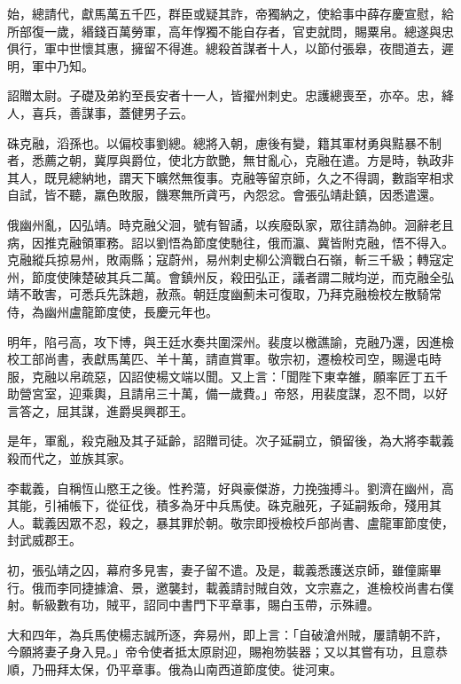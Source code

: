 \begin{pinyinscope}
 始，總請代，獻馬萬五千匹，群臣或疑其詐，帝獨納之，使給事中薛存慶宣慰，給所部復一歲，緡錢百萬勞軍，高年惸獨不能自存者，官吏就問，賜粟帛。總遂與忠俱行，軍中世懷其惠，擁留不得進。總殺首謀者十人，以節付張皋，夜間道去，遲明，軍中乃知。



 詔贈太尉。子礎及弟約至長安者十一人，皆擢州刺史。忠護總喪至，亦卒。忠，絳人，喜兵，善謀事，蓋健男子云。



 硃克融，滔孫也。以偏校事劉總。總將入朝，慮後有變，籍其軍材勇與黠暴不制者，悉薦之朝，冀厚與爵位，使北方歆艷，無甘亂心，克融在遣。方是時，執政非其人，既見總納地，謂天下曠然無復事。克融等留京師，久之不得調，數詣宰相求自試，皆不聽，羸色敗服，饑寒無所貣丐，內怨忿。會張弘靖赴鎮，因悉遣還。



 俄幽州亂，囚弘靖。時克融父洄，號有智譎，以疾廢臥家，眾往請為帥。洄辭老且病，因推克融領軍務。詔以劉悟為節度使馳往，俄而瀛、冀皆附克融，悟不得入。克融縱兵掠易州，敗兩縣；寇蔚州，易州刺史柳公濟戰白石嶺，斬三千級；轉寇定州，節度使陳楚破其兵二萬。會鎮州反，殺田弘正，議者謂二賊均逆，而克融全弘靖不敢害，可悉兵先誅趙，赦燕。朝廷度幽薊未可復取，乃拜克融檢校左散騎常侍，為幽州盧龍節度使，長慶元年也。



 明年，陷弓高，攻下博，與王廷水奏共圍深州。裴度以檄譙諭，克融乃還，因進檢校工部尚書，表獻馬萬匹、羊十萬，請直賞軍。敬宗初，遷檢校司空，賜邊屯時服，克融以帛疏惡，囚詔使楊文端以聞。又上言：「聞陛下東幸雒，願率匠丁五千助營宮室，迎乘輿，且請帛三十萬，備一歲費。」帝怒，用裴度謀，忍不問，以好言答之，屈其謀，進爵吳興郡王。



 是年，軍亂，殺克融及其子延齡，詔贈司徒。次子延嗣立，領留後，為大將李載義殺而代之，並族其家。



 李載義，自稱恆山愍王之後。性矜蕩，好與豪傑游，力挽強搏斗。劉濟在幽州，高其能，引補帳下，從征伐，積多為牙中兵馬使。硃克融死，子延嗣叛命，殘用其人。載義因眾不忍，殺之，暴其罪於朝。敬宗即授檢校戶部尚書、盧龍軍節度使，封武威郡王。



 初，張弘靖之囚，幕府多見害，妻子留不遣。及是，載義悉護送京師，雖僮廝畢行。俄而李同捷據滄、景，邀襲封，載義請討賊自效，文宗嘉之，進檢校尚書右僕射。斬級數有功，賊平，詔同中書門下平章事，賜白玉帶，示殊禮。



 大和四年，為兵馬使楊志誠所逐，奔易州，即上言：「自破滄州賊，屢請朝不許，今願將妻子身入見。」帝令使者抵太原尉迎，賜袍笏裝器；又以其嘗有功，且意恭順，乃冊拜太保，仍平章事。俄為山南西道節度使。徙河東。



\end{pinyinscope}
